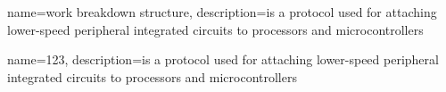 \makeglossaries
{}
{
    name=work breakdown structure,
    description={is a protocol used for attaching lower-speed peripheral integrated circuits to processors and microcontrollers}
}

{
    name=123,
    description={is a protocol used for attaching lower-speed peripheral integrated circuits to processors and microcontrollers}
}